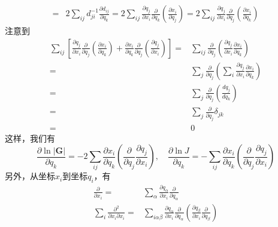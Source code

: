 \begin{note}
\begin{equation}
\begin{aligned}
    =& 2\sum_{ij}d^{-1}_{ji}\frac{\partial d_{ij}}{\partial q_{k}} = 2 \sum_{ij}\frac{\partial q_{j}}{\partial x_{i}} \frac{\partial}{\partial q_{k}} \left(\frac{\partial x_{i}}{\partial q_j}\right) = 2 \sum_{ij}\frac{\partial q_{j}}{\partial x_{i}} \frac{\partial}{\partial q_{j}} \left(\frac{\partial x_{i}}{\partial q_k}\right)
\end{aligned}\end{equation}
注意到
\begin{equation}\begin{aligned}
    \sum_{ij}\left[\frac{\partial q_{j}}{\partial x_{i}} \frac{\partial}{\partial q_{j}} \left(\frac{\partial x_{i}}{\partial q_k}\right) + \frac{\partial x_{i}}{\partial q_k}\frac{\partial}{\partial q_{j}} \left(\frac{\partial q_{j}}{\partial x_{i}} \right)\right] =& \sum_{ij} \frac{\partial }{\partial q_{j}} \left(\frac{\partial q_{j}}{\partial x_{i}} \frac{\partial x_{i}}{\partial q_{k}}\right) \\
    =& \sum_{j}\frac{\partial }{\partial q_{j}} \left(\sum_{i} \frac{\partial q_{j}}{\partial x_{i}} \frac{\partial x_{i}}{\partial q_{k}}\right) \\
    =& \sum_{j}\frac{\partial }{\partial q_{j}} \left(\frac{d q_{j}}{d q_{k}}\right) \\
    =& \sum_{j}\frac{\partial }{\partial q_{j}} \delta_{jk} \\
    =& 0
\end{aligned}\end{equation}
这样，我们有
\begin{equation}
    \frac{\partial \ln{|\bm{G}|}}{\partial q_k} = -2\sum_{ij}\frac{\partial x_{i}}{\partial q_k} \left(\frac{\partial}{\partial q_{j}}\frac{\partial q_{j}}{\partial x_{i}} \right), \quad \frac{\partial \ln{J}}{\partial q_k} = -\sum_{ij}\frac{\partial x_{i}}{\partial q_k} \left(\frac{\partial}{\partial q_{j}}\frac{\partial q_{j}}{\partial x_{i}} \right)
\end{equation}
另外，从坐标$x_{i}$到坐标$q_{i}$，有
\begin{equation}\begin{aligned}
    \frac{\partial}{\partial x_{i}} =& \sum_{\alpha} \frac{\partial q_{\alpha}}{\partial x_{i}} \frac{\partial}{\partial q_{\alpha}} \\
    \sum_{i}\frac{\partial^{2}}{\partial x_{i} \partial x_{i}} =& \sum_{i \alpha\beta} \frac{\partial q_{\alpha}}{\partial x_{i}} \frac{\partial}{\partial q_{\alpha}} \left(\frac{\partial q_{\beta}}{\partial x_{i}} \frac{\partial}{\partial q_{\beta}}\right) \\

\end{aligned}
\end{equation}
\end{note}

